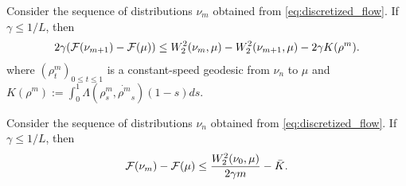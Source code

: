 
\begin{proposition}\label{prop:evi}
	Consider the sequence of distributions $\nu_m$ obtained from \cref{eq:discretized_flow}. If $\gamma \leq 1/L$, then
	\begin{align}
2\gamma({{\mathcal F}}(\nu_{m+1})-{{\mathcal F}}(\mu))
\leq 
W_2^2(\nu_m,\mu)-W_2^2(\nu_{m+1},\mu)-2\gamma K(\rho^m).
\label{eq:evi}
\end{align}
where $(\rho^m_t)_{0\leq t \leq 1}$ is a constant-speed geodesic from $\nu_n$ to $\mu$ and $K(\rho^m):=\int_0^1 \Lambda(\rho^m_s,\dot{\rho^m}_s)(1-s)ds$.
\end{proposition}

\begin{theorem}\label{th:rates_mmd}
	Consider the sequence of distributions $\nu_n$ obtained from \cref{eq:discretized_flow}. If $\gamma \leq 1/L$, then
\begin{align}
{{\mathcal F}}(\nu_m)-{{\mathcal F}}(\mu)\leq  \frac{W_2^2(\nu_0,\mu)}{2 \gamma m} -\bar{K}.
\end{align}
\end{theorem}










